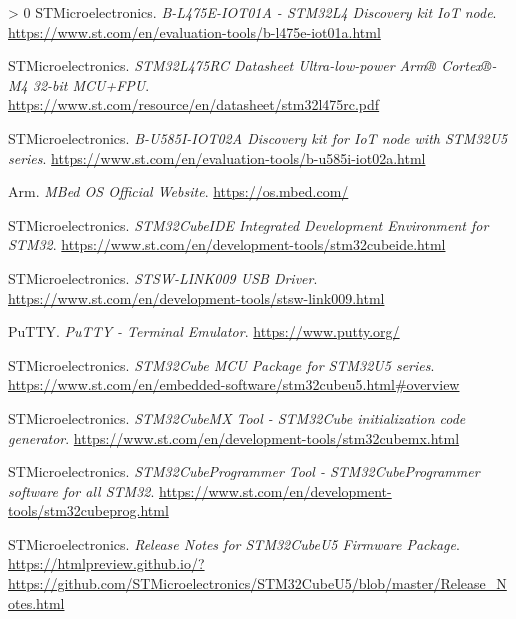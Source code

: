 \documentclass[10pt,a4paper,onecolumn]{article}
\newlength{\cslhangindent}
\newenvironment{CSLReferences}[3] %
 {%
  \setlength{\parindent}{0pt}
  \ifodd #1 \everypar{\setlength{\hangindent}{\cslhangindent}}\ignorespaces\fi
  \ifnum #2 > 0
  \setlength{\parskip}{#2\baselineskip}
  \fi
 }%
 {}
\begin{document}
\hypertarget{refs}{}
\begin{CSLReferences}{1}{0}
  \leavevmode\hypertarget{ref-Discovery-Kit-IoT-User-Manual}{}%
  STMicroelectronics. \textit{B-L475E-IOT01A - STM32L4 Discovery kit IoT node}. \url{https://www.st.com/en/evaluation-tools/b-l475e-iot01a.html}
  
  \leavevmode\hypertarget{ref-STM32L475RC-Datasheet}{}%
  STMicroelectronics. \textit{STM32L475RC Datasheet Ultra-low-power Arm® Cortex®-M4 32-bit MCU+FPU}. \url{https://www.st.com/resource/en/datasheet/stm32l475rc.pdf}
  
  \leavevmode\hypertarget{ref-B-U585I-IOT02A-Datasheet}{}%
  STMicroelectronics. \textit{B-U585I-IOT02A Discovery kit for IoT node with STM32U5 series}. \url{https://www.st.com/en/evaluation-tools/b-u585i-iot02a.html}
  
  \leavevmode\hypertarget{ref-mbed-OS}{}%
  Arm. \textit{MBed OS Official Website}. \url{https://os.mbed.com/}
  
  \leavevmode\hypertarget{ref-STM32CubeIDE}{}%
  STMicroelectronics. \textit{STM32CubeIDE Integrated Development Environment for STM32}. \url{https://www.st.com/en/development-tools/stm32cubeide.html}
  
  \leavevmode\hypertarget{ref-STSW-LINK009}{}%
  STMicroelectronics. \textit{STSW-LINK009 USB Driver}. \url{https://www.st.com/en/development-tools/stsw-link009.html}
  
  \leavevmode\hypertarget{ref-PuTTY}{}%
  PuTTY. \textit{PuTTY - Terminal Emulator}. \url{https://www.putty.org/}
  
  \leavevmode\hypertarget{ref-STM32U5-series-package}{}%
  STMicroelectronics. \textit{STM32Cube MCU Package for STM32U5 series}. \url{https://www.st.com/en/embedded-software/stm32cubeu5.html#overview}
  
  \leavevmode\hypertarget{ref-STM32CubeMX}{}%
  STMicroelectronics. \textit{STM32CubeMX Tool - STM32Cube initialization code generator}. \url{https://www.st.com/en/development-tools/stm32cubemx.html}
  
  \leavevmode\hypertarget{ref-STM32CubeProgrammer}{}%
  STMicroelectronics. \textit{STM32CubeProgrammer Tool - STM32CubeProgrammer software for all STM32}. \url{https://www.st.com/en/development-tools/stm32cubeprog.html}
  
  \leavevmode\hypertarget{ref-Release-Notes-STM32CubeU5}{}%
  STMicroelectronics. \textit{Release Notes for STM32CubeU5 Firmware Package}. \url{https://htmlpreview.github.io/?https://github.com/STMicroelectronics/STM32CubeU5/blob/master/Release_Notes.html}
  

\end{CSLReferences}
\end{document}
